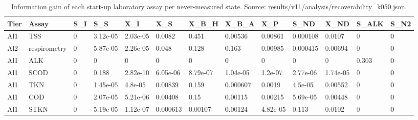 \begin{table}[t]
\centering
\caption{Information gain of each start-up laboratory assay per never-measured state. Source: results/v11/analysis/recoverability\_k050.json.}
\label{tab:si-lab}
\footnotesize
\begin{tabular}{lllllllllllll}
\toprule
Tier & Assay & S\_I & S\_S & X\_I & X\_S & X\_B\_H & X\_B\_A & X\_P & S\_ND & X\_ND & S\_ALK & S\_N2 \\
\midrule
Al1 & TSS & 0 & 3.12e-05 & 2.03e-05 & 0.0082 & 0.451 & 0.00536 & 0.00861 & 0.000108 & 0.0107 & 0 & 0 \\
Al2 & respirometry & 0 & 5.87e-05 & 2.26e-05 & 0.048 & 0.128 & 0.163 & 0.00985 & 0.000415 & 0.00694 & 0 & 0 \\
Al1 & ALK & 0 & 0 & 0 & 0 & 0 & 0 & 0 & 0 & 0 & 0.303 & 0 \\
Al1 & SCOD & 0 & 0.188 & 2.82e-10 & 6.05e-06 & 8.79e-07 & 1.04e-05 & 1.2e-07 & 2.77e-06 & 1.74e-05 & 0 & 0 \\
Al1 & TKN & 0 & 1.45e-05 & 4.8e-05 & 0.00839 & 0.159 & 0.000607 & 0.0019 & 4.5e-05 & 0.00552 & 0 & 0 \\
Al1 & COD & 0 & 2.07e-05 & 5.21e-06 & 0.00408 & 0.15 & 0.00115 & 0.00215 & 5.69e-05 & 0.00448 & 0 & 0 \\
Al1 & STKN & 0 & 5.19e-05 & 1.12e-07 & 0.000613 & 0.00107 & 0.00124 & 4.82e-05 & 0.113 & 0.0102 & 0 & 0 \\
\bottomrule
\end{tabular}
\end{table}
